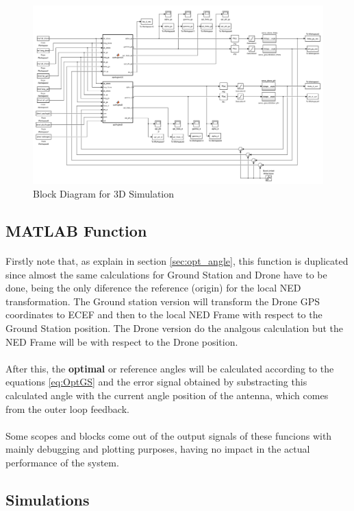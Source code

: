 \clearpage

\begin{figure}
	\centering
	\includegraphics[width=1.1\textwidth,height=1.1\textheight,keepaspectratio]{figures/diagram_3D.png}
	\caption{Block Diagram for 3D Simulation}
   	\label{fig:diagram3D}
\end{figure}

\clearpage

\subsection*{MATLAB Function}
\paragraph{}Firstly note that, as explain in section \ref{sec:opt_angle}, this function is duplicated since almost the same calculations for Ground Station and Drone have to be done, being the only diference the reference (origin) for the local NED transformation.
The Ground station version will transform the Drone GPS coordinates to ECEF and then to the local NED Frame with respect to the Ground Station position. The Drone version do the analgous calculation but the NED Frame will be with respect to the Drone position.

\paragraph{}After this, the \textbf{optimal} or {reference} angles will be calculated according to the equations \ref{eq:OptGS} and the error signal obtained by substracting this calculated angle with the current angle position of the antenna, which comes from the outer loop feedback.

\paragraph{} Some scopes and blocks come out of the output signals of these funcions with mainly debugging and plotting purposes, having no impact in the actual performance of the system. 

\subsection*{Simulations}